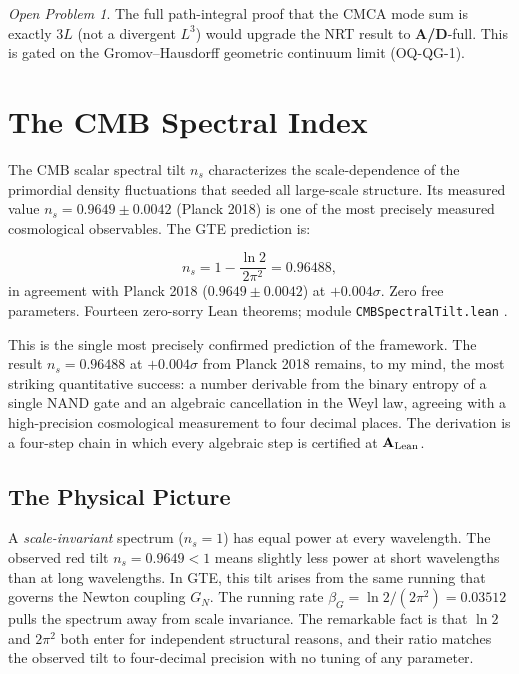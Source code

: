 \documentclass[11pt,openany]{book}
\theoremstyle{remark}
\newtheorem{openprob}{Open Problem}[chapter]
\newcommand{\lean}[1]{%
  \penalty-100
  \begingroup\def\_{\textunderscore\allowbreak}\texttt{#1}\endgroup}
\newcommand{\ns}{n_s}
\newcommand{\betaG}{\beta_G}
\newcommand{\CatAL}{\ensuremath{\textbf{A}_{\rm Lean}}}
\newcommand{\CatAD}{\textbf{A/D}}
\begin{document}
\begin{openprob}
The full path-integral proof that the CMCA mode sum is exactly $3L$
(not a divergent $L^3$) would upgrade the NRT result to \CatAD-full.
This is gated on the Gromov--Hausdorff geometric continuum limit (OQ-QG-1).
\end{openprob}

\section{The CMB Spectral Index}
\label{sec:ns}

The CMB scalar spectral tilt $\ns$ characterizes the scale-dependence of the primordial
density fluctuations that seeded all large-scale structure.
Its measured value $\ns = 0.9649 \pm 0.0042$ (Planck 2018) is one of the most precisely
measured cosmological observables.
The GTE prediction is:

\begin{tcolorbox}[colback=orange!5,colframe=orange!60,
  title={Result: CMB Spectral Index (\CatAL)}]
  \[
    \ns = 1 - \frac{\ln 2}{2\pi^2} = 0.96488,
  \]
  in agreement with Planck 2018 ($0.9649 \pm 0.0042$) at $+0.004\sigma$.
  Zero free parameters.
  Fourteen zero-sorry Lean theorems; module \lean{CMBSpectralTilt.lean}
  \cite{SpivackGTECosmology}.
\end{tcolorbox}

This is the single most precisely confirmed prediction of the framework.
The result $\ns = 0.96488$ at $+0.004\sigma$ from Planck 2018 remains, to my mind,
the most striking quantitative success: a number derivable from the binary entropy of
a single NAND gate and an algebraic cancellation in the Weyl law, agreeing with a
high-precision cosmological measurement to four decimal places.
The derivation is a four-step chain in which every algebraic step is certified at \CatAL.

\subsection*{The Physical Picture}

A \emph{scale-invariant} spectrum ($\ns = 1$) has equal power at every wavelength.
The observed red tilt $\ns = 0.9649 < 1$ means slightly less power at short wavelengths
than at long wavelengths.
In GTE, this tilt arises from the same running that governs the Newton coupling $G_N$.
The running rate $\betaG = \ln 2/(2\pi^2) = 0.03512$ pulls the spectrum away from scale
invariance.
The remarkable fact is that $\ln 2$ and $2\pi^2$ both enter for independent structural
reasons, and their ratio matches the observed tilt to four-decimal precision with no
tuning of any parameter.
\end{document}
